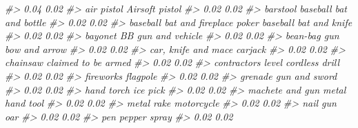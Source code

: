 \documentclass[
  12pt,
]{book}
\newenvironment{Shaded}{\begin{snugshade}}{\end{snugshade}}
\newcommand{\CommentTok}[1]{\textcolor[rgb]{0.37,0.37,0.37}{\textit{#1}}}
\begin{document}
\begin{Shaded}
\begin{Highlighting}[]
\CommentTok{\#>                             0.04                             0.02 }
\CommentTok{\#>                       air pistol                   Airsoft pistol }
\CommentTok{\#>                             0.02                             0.02 }
\CommentTok{\#>                         barstool          baseball bat and bottle }
\CommentTok{\#>                             0.02                             0.02 }
\CommentTok{\#> baseball bat and fireplace poker           baseball bat and knife }
\CommentTok{\#>                             0.02                             0.02 }
\CommentTok{\#>                          bayonet               BB gun and vehicle }
\CommentTok{\#>                             0.02                             0.02 }
\CommentTok{\#>                     bean{-}bag gun                    bow and arrow }
\CommentTok{\#>                             0.02                             0.02 }
\CommentTok{\#>              car, knife and mace                          carjack }
\CommentTok{\#>                             0.02                             0.02 }
\CommentTok{\#>                         chainsaw              claimed to be armed }
\CommentTok{\#>                             0.02                             0.02 }
\CommentTok{\#>               contractor\textquotesingle{}s level                   cordless drill }
\CommentTok{\#>                             0.02                             0.02 }
\CommentTok{\#>                        fireworks                         flagpole }
\CommentTok{\#>                             0.02                             0.02 }
\CommentTok{\#>                          grenade                    gun and sword }
\CommentTok{\#>                             0.02                             0.02 }
\CommentTok{\#>                       hand torch                         ice pick }
\CommentTok{\#>                             0.02                             0.02 }
\CommentTok{\#>                  machete and gun                  metal hand tool }
\CommentTok{\#>                             0.02                             0.02 }
\CommentTok{\#>                       metal rake                       motorcycle }
\CommentTok{\#>                             0.02                             0.02 }
\CommentTok{\#>                         nail gun                              oar }
\CommentTok{\#>                             0.02                             0.02 }
\CommentTok{\#>                              pen                     pepper spray }
\CommentTok{\#>                             0.02                             0.02 }

\end{Highlighting}
\end{Shaded}
\end{document}
